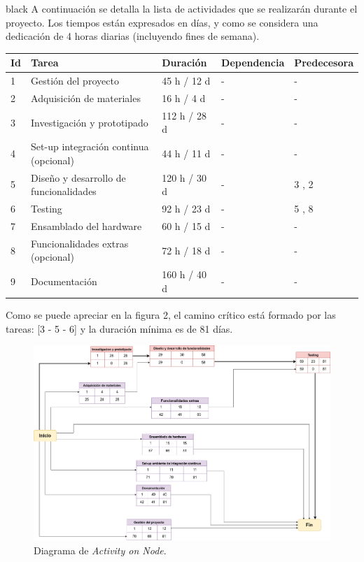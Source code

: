 \documentclass[
11pt, %
]{charter}
\begin{document}
\begin{consigna}{black}
A continuación se detalla la lista de actividades que se realizarán durante el proyecto. Los tiempos están expresados en días, y como se considera una dedicación de 4 horas diarias (incluyendo fines de semana). 

\begin{table}[ht]
\begin{tabularx}{\linewidth}{@{}|l|X|l|l|l|@{}}
\hline
\rowcolor[HTML]{C0C0C0} 
Id	& Tarea           									& Duración 			& Dependencia	& Predecesora 	\\ \hline
1	& Gestión del proyecto 								& 45 h / 12 d		& -				&  - 		\\ \hline
2	& Adquisición de materiales 						& 16 h / 4 d		& -				&  -      		\\ \hline
3	& Investigación y prototipado						& 112 h / 28 d		& -				&  -      		\\ \hline
4	& Set-up integración continua (opcional)			& 44 h / 11 d   	& -        		&  -			\\ \hline
5	& Diseño y desarrollo de funcionalidades    		& 120 h / 30 d		& -			 	& 3 , 2			\\ \hline
6	& Testing								    		& 92 h / 23 d		& -				& 5 , 8			\\ \hline
7	& Ensamblado del hardware				    		& 60 h / 15 d		& -				& -				\\ \hline
8	& Funcionalidades extras (opcional)					& 72 h / 18 d		& -				& - 			\\ \hline
9	& Documentación    									& 160 h / 40 d		& -			 	& -				\\ \hline

\end{tabularx}
\end{table}


Como se puede apreciar en la figura 2, el camino crítico está formado por las tareas: [3 - 5 - 6] y la duración mínima es de 81 días.


\begin{figure}[htpb]
\centering 
\includegraphics[width=.9\textwidth]{./Figuras/activity-on-node.png}
\caption{Diagrama de \textit{Activity on Node}.}
\label{fig:diagBloques}
\end{figure}
\end{consigna}
\end{document}
